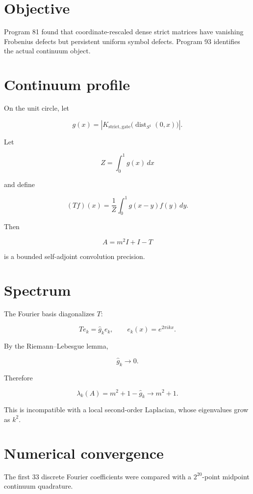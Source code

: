 \documentclass[11pt,a4paper,openany]{report}
\begin{document}
\section{Objective}

Program 81 found that coordinate-rescaled dense strict matrices have vanishing Frobenius defects but persistent uniform symbol defects. Program 93 identifies the actual continuum object.

\section{Continuum profile}

On the unit circle, let

\[
g(x)
=
\left|
K_{\mathrm{strict,gate}}
\bigl(\operatorname{dist}_{S^1}(0,x)\bigr)
\right|.
\]

Let

\[
Z=\int_0^1g(x)\,dx
\]

and define

\[
(Tf)(x)
=
\frac1Z
\int_0^1
g(x-y)f(y)\,dy.
\]

Then

\[
A=m^2I+I-T
\]

is a bounded self-adjoint convolution precision.

\section{Spectrum}

The Fourier basis diagonalizes \(T\):

\[
T e_k=\widehat g_k e_k,
\qquad
e_k(x)=e^{2\pi ikx}.
\]

By the Riemann--Lebesgue lemma,

\[
\widehat g_k\longrightarrow0.
\]

Therefore

\[
\lambda_k(A)
=
m^2+1-\widehat g_k
\longrightarrow
m^2+1.
\]

This is incompatible with a local second-order Laplacian, whose eigenvalues grow as \(k^2\).

\section{Numerical convergence}

The first 33 discrete Fourier coefficients were compared with a \(2^{20}\)-point midpoint continuum quadrature.
\end{document}

